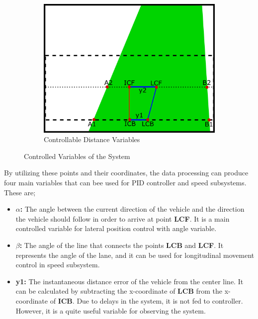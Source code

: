 \documentclass[a4paper,12pt]{article}
\begin{document}
\begin{enumerate}
\begin{figure}[H]
\begin{subfigure}{.46\textwidth}
\includegraphics[width=0.45\unitlength]{images/dist_cont}

\caption{\label{fig:dist-cont} Controllable Distance Variables}

\end{subfigure}

\caption{\label{fig:controlled-vars} Controlled Variables of the System }

\end{figure}




By utilizing these points and their coordinates, the data processing can produce four main variables that can bee used for PID controller and speed subsystems. These are;


\begin{itemize}

\item \textbf{$\alpha$:} The angle between the current direction of the vehicle and the direction the vehicle should follow in order to arrive at point \textbf{LCF}. It is a main controlled variable for lateral position control with angle variable.


\item \textbf{$\beta$:} The angle of the line that connects the points \textbf{LCB} and \textbf{LCF}. It represents the angle of the lane, and it can be used for longitudinal movement control in speed subsystem.


\item \textbf{y1:} The instantaneous distance error of the vehicle from the center line. It can be calculated by subtracting the x-coordinate of \textbf{LCB} from the x-coordinate of \textbf{ICB}. Due to delays in the system, it is not fed to controller. However, it is a quite useful variable for observing the system.  



\end{itemize}
\end{enumerate}
\end{document}
